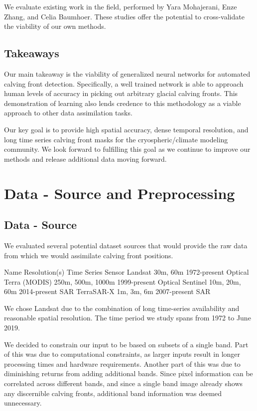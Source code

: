 \documentclass[tc, manuscript]{copernicus}
\begin{document}
We evaluate existing work in the field, performed by Yara Mohajerani, Enze Zhang, and Celia Baumhoer. These studies offer the potential to cross-validate the viability of our own methods.

\subsection{Takeaways}
Our main takeaway is the viability of generalized neural networks for automated calving front detection. Specifically, a well trained network is able to approach human levels of accuracy in picking out arbitrary glacial calving fronts. This demonstration of learning also lends credence to this methodology as a viable approach to other data assimilation tasks.

Our key goal is to provide high spatial accuracy, dense temporal resolution, and long time series calving front masks for the cryospheric/climate modeling community. We look forward to fulfilling this goal as we continue to improve our methods and release additional data moving forward.

\section{Data - Source and Preprocessing}
\subsection{Data - Source}
We evaluated several potential dataset sources that would provide the raw data from which we would assimilate calving front positions.

Name            Resolution(s)       Time Series     Sensor  
Landsat         30m, 60m            1972-present    Optical
Terra (MODIS)   250m, 500m, 1000m   1999-present    Optical
Sentinel        10m, 20m, 60m       2014-present    SAR
TerraSAR-X      1m, 3m, 6m          2007-present    SAR

We chose Landsat due to the combination of long time-series availability and reasonable spatial resolution. The time period we study spans from 1972 to June 2019.


We decided to constrain our input to be based on subsets of a single band. Part of this was due to computational constraints, as larger inputs result in longer processing times and hardware requirements. Another part of this was due to diminishing returns from adding additional bands. Since pixel information can be correlated across different bands, and since a single band image already shows any discernible calving fronts, additional band information was deemed unnecessary.
\end{document}
